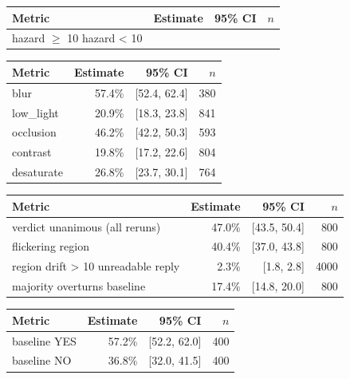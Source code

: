 \begin{tabular}{lrrr}
\toprule
Metric & Estimate & 95\% CI & $n$ \\
\midrule
hazard $\geq$ 10%
hazard < 10%
\bottomrule
\end{tabular}

\begin{tabular}{lrrr}
\toprule
Metric & Estimate & 95\% CI & $n$ \\
\midrule
blur & 57.4\% & [52.4, 62.4] & 380 \\
low\_light & 20.9\% & [18.3, 23.8] & 841 \\
occlusion & 46.2\% & [42.2, 50.3] & 593 \\
contrast & 19.8\% & [17.2, 22.6] & 804 \\
desaturate & 26.8\% & [23.7, 30.1] & 764 \\
\bottomrule
\end{tabular}

\begin{tabular}{lrrr}
\toprule
Metric & Estimate & 95\% CI & $n$ \\
\midrule
verdict unanimous (all reruns) & 47.0\% & [43.5, 50.4] & 800 \\
flickering region & 40.4\% & [37.0, 43.8] & 800 \\
region drift > 10%
unreadable reply & 2.3\% & [1.8, 2.8] & 4000 \\
majority overturns baseline & 17.4\% & [14.8, 20.0] & 800 \\
\bottomrule
\end{tabular}

\begin{tabular}{lrrr}
\toprule
Metric & Estimate & 95\% CI & $n$ \\
\midrule
baseline YES & 57.2\% & [52.2, 62.0] & 400 \\
baseline NO & 36.8\% & [32.0, 41.5] & 400 \\
\bottomrule
\end{tabular}

